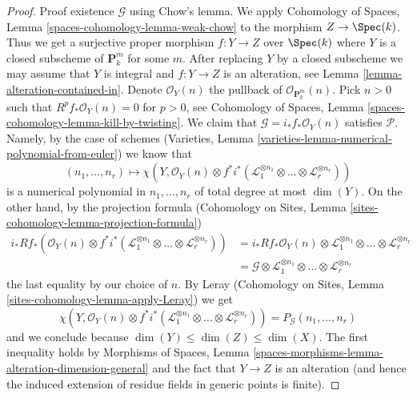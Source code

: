 \begin{proof}
\medskip\noindent
Proof existence $\mathcal{G}$ using Chow's lemma. We apply
Cohomology of Spaces, Lemma \ref{spaces-cohomology-lemma-weak-chow}
to the morphism $Z \to \Spec(k)$. Thus we get a
surjective proper morphism $f : Y \to Z$ over $\Spec(k)$
where $Y$ is a closed subscheme of $\mathbf{P}^m_k$ for some $m$.
After replacing $Y$ by a closed subscheme we may assume that $Y$
is integral and $f : Y \to Z$ is an alteration, see
Lemma \ref{lemma-alteration-contained-in}.
Denote $\mathcal{O}_Y(n)$ the pullback of $\mathcal{O}_{\mathbf{P}^m_k}(n)$.
Pick $n > 0$ such that $R^pf_*\mathcal{O}_Y(n) = 0$
for $p > 0$, see Cohomology of Spaces, Lemma
\ref{spaces-cohomology-lemma-kill-by-twisting}.
We claim that $\mathcal{G} = i_*f_*\mathcal{O}_Y(n)$ satisfies $\mathcal{P}$.
Namely, by the case of schemes
(Varieties, Lemma \ref{varieties-lemma-numerical-polynomial-from-euler})
we know that
$$
(n_1, \ldots, n_r)
\longmapsto
\chi(Y, \mathcal{O}_Y(n) \otimes
f^*i^*(\mathcal{L}_1^{\otimes n_1} \otimes \ldots \otimes
\mathcal{L}_r^{\otimes n_r}))
$$
is a numerical polynomial in $n_1, \ldots, n_r$ of total degree at
most $\dim(Y)$. On the other hand, by the projection formula
(Cohomology on Sites, Lemma \ref{sites-cohomology-lemma-projection-formula})
\begin{align*}
i_*Rf_*\left(
\mathcal{O}_Y(n) \otimes
f^*i^*(\mathcal{L}_1^{\otimes n_1} \otimes \ldots \otimes
\mathcal{L}_r^{\otimes n_r})\right)
& =
i_*Rf_*\mathcal{O}_Y(n) \otimes
\mathcal{L}_1^{\otimes n_1} \otimes \ldots \otimes
\mathcal{L}_r^{\otimes n_r} \\
& =
\mathcal{G} \otimes \mathcal{L}_1^{\otimes n_1} \otimes \ldots \otimes
\mathcal{L}_r^{\otimes n_r}
\end{align*}
the last equality by our choice of $n$. By
Leray (Cohomology on Sites, Lemma \ref{sites-cohomology-lemma-apply-Leray})
we get
$$
\chi(Y, \mathcal{O}_Y(n) \otimes
f^*i^*(\mathcal{L}_1^{\otimes n_1} \otimes \ldots \otimes
\mathcal{L}_r^{\otimes n_r})) =
P_\mathcal{G}(n_1, \ldots, n_r)
$$
and we conclude because $\dim(Y) \leq \dim(Z) \leq \dim(X)$.
The first inequality holds by
Morphisms of Spaces, Lemma
\ref{spaces-morphisms-lemma-alteration-dimension-general}
and the fact that $Y \to Z$ is an alteration (and hence the
induced extension of residue fields in generic points is finite).
\end{proof}

